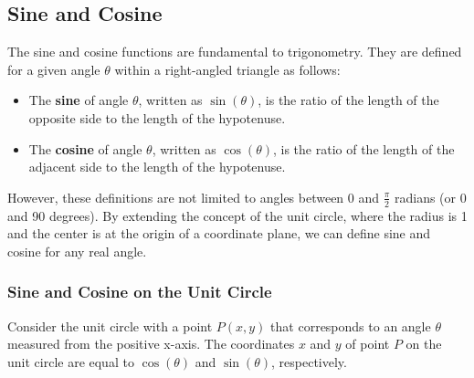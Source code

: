 \documentclass[a4paper,12pt]{book}
\begin{document}



\subsection{Sine and Cosine}
\label{subsec:sine_cosine}

The sine and cosine functions are fundamental to trigonometry. They are defined for a given angle \( \theta \) within a right-angled triangle as follows:

\begin{itemize}
    \item The \textbf{sine} of angle \( \theta \), written as \( \sin(\theta) \), is the ratio of the length of the opposite side to the length of the hypotenuse.
    \item The \textbf{cosine} of angle \( \theta \), written as \( \cos(\theta) \), is the ratio of the length of the adjacent side to the length of the hypotenuse.
\end{itemize}

However, these definitions are not limited to angles between 0 and \( \frac{\pi}{2} \) radians (or 0 and 90 degrees). By extending the concept of the unit circle, where the radius is 1 and the center is at the origin of a coordinate plane, we can define sine and cosine for any real angle.

\subsubsection*{Sine and Cosine on the Unit Circle}
Consider the unit circle with a point \( P(x, y) \) that corresponds to an angle \( \theta \) measured from the positive x-axis. The coordinates \( x \) and \( y \) of point \( P \) on the unit circle are equal to \( \cos(\theta) \) and \( \sin(\theta) \), respectively.
\end{document}

